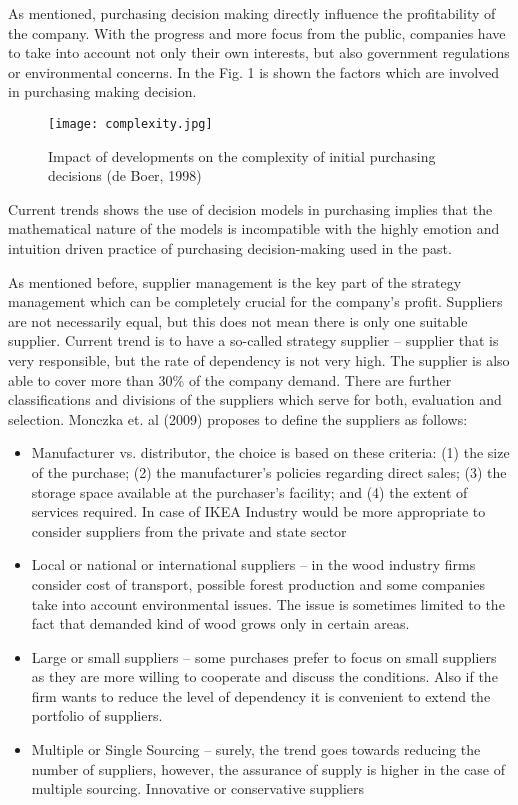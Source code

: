 \documentclass[oneside,12pt]{article}%
\begin{document}
As mentioned, purchasing decision making directly influence the profitability of the company. With the progress and more focus from the public, companies have to take into account not only their own interests, but also government regulations or environmental concerns. In the Fig. 1 is shown the factors which are involved in purchasing making decision.

\begin{figure}[ht!]
  \texttt{[image: complexity.jpg]}
  \caption{Impact of developments on the complexity of initial purchasing decisions (de Boer, 1998)}
\end{figure}

Current trends shows the use of decision models in purchasing implies that the mathematical nature of the models is incompatible with the highly emotion and intuition driven practice of purchasing decision-making used in the past.

As mentioned before, supplier management is the key part of the strategy management which can be completely crucial for the company’s profit. Suppliers are not necessarily equal, but this does not mean there is only one suitable supplier. Current trend is to have a so-called strategy supplier – supplier that is very responsible, but the rate of dependency is not very high. The supplier is also able to cover more than 30\% of the company demand.
There are further classifications and divisions of the suppliers which serve for both, evaluation and selection. Monczka et. al (2009) proposes to define the suppliers as follows:

\begin{itemize}
  \item Manufacturer vs. distributor, the choice is based on these criteria: (1) the size of the purchase; (2) the manufacturer’s policies regarding direct sales; (3) the storage space available at the purchaser’s facility; and (4) the extent of services required. In case of IKEA Industry would be more appropriate to consider suppliers from the private and state sector
  \item Local or national or international suppliers – in the wood industry firms consider cost of transport, possible forest production and some companies take into account environmental issues. The issue is sometimes limited to the fact that demanded kind of wood grows only in certain areas.
  \item Large or small suppliers – some purchases prefer to focus on small suppliers as they are more willing to cooperate and discuss the conditions. Also if the firm wants to reduce the level of dependency it is convenient to extend the portfolio of suppliers.
  \item Multiple or Single Sourcing – surely, the trend goes towards reducing the number of suppliers, however, the assurance of supply is higher in the case of multiple sourcing.
  Innovative or conservative suppliers
\end{itemize}
\end{document}

